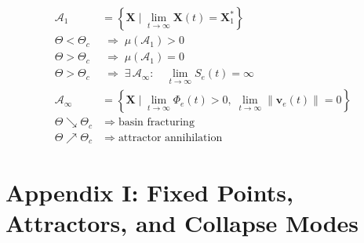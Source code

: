 \documentclass[11pt,oneside]{article}
\begin{document}
\begin{align}
\mathcal{A}_1
&=
\left\{
\mathbf{X} \mid
\lim_{t \to \infty}
\mathbf{X}(t) = \mathbf{X}_1^\ast
\right\}
\\[14pt]

\Theta < \Theta_c
&\;\Longrightarrow\;
\mu(\mathcal{A}_1) > 0
\\[10pt]

\Theta > \Theta_c
&\;\Longrightarrow\;
\mu(\mathcal{A}_1) = 0
\\[14pt]

\Theta > \Theta_c
&\;\Longrightarrow\;
\exists\, \mathcal{A}_\infty :
\quad
\lim_{t \to \infty} S_e(t) = \infty
\\[14pt]

\mathcal{A}_\infty
&=
\left\{
\mathbf{X} \mid
\lim_{t \to \infty}
\Phi_e(t) > 0,\;
\lim_{t \to \infty}
\|\mathbf{v}_e(t)\| = 0
\right\}
\\[14pt]

\Theta \searrow \Theta_c
&\;\Longrightarrow\;
\text{basin fracturing}
\\[10pt]

\Theta \nearrow \Theta_c
&\;\Longrightarrow\;
\text{attractor annihilation}
\end{align}

\section{Appendix I: Fixed Points, Attractors, and Collapse Modes}
\end{document}
